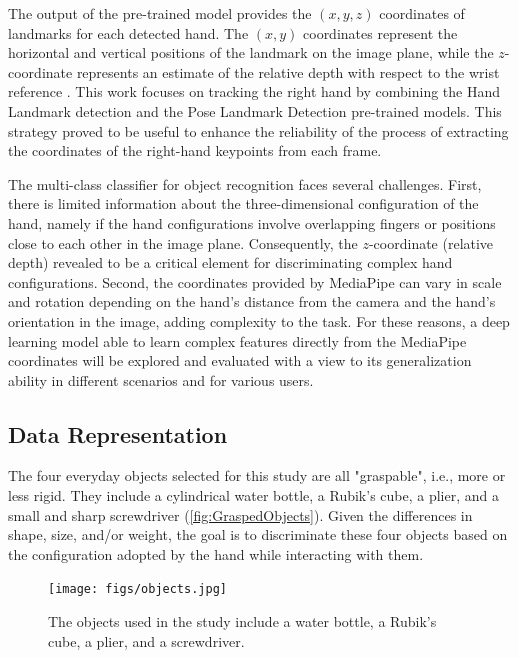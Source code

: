 The output of the pre-trained model provides the $(x,y,z)$ coordinates of landmarks for each detected hand. The $(x,y)$ coordinates represent the horizontal and vertical positions of the landmark on the image plane, while the $z$-coordinate represents an estimate of the relative depth with respect to the wrist reference \cite{Amprimo2023}. This work focuses on tracking the right hand by combining the Hand Landmark detection and the Pose Landmark Detection pre-trained models. This strategy proved to be useful to enhance the reliability of the process of extracting the coordinates of the right-hand keypoints from each frame.

The multi-class classifier for object recognition faces several challenges. First, there is limited information about the three-dimensional configuration of the hand, namely if the hand configurations involve overlapping fingers or positions close to each other in the image plane. Consequently, the $z$-coordinate (relative depth) revealed to be a critical element for discriminating complex hand configurations. Second, the coordinates provided by MediaPipe can vary in scale and rotation depending on the hand's distance from the camera and the hand's orientation in the image, adding complexity to the task. For these reasons, a deep learning model able to learn complex features directly from the MediaPipe coordinates will be explored and evaluated with a view to its generalization ability in different scenarios and for various users.

\subsection{Data Representation}
\label{section:data_representation}

The four everyday objects selected for this study are all "graspable", i.e., more or less rigid. They include a cylindrical water bottle, a Rubik's cube, a plier, and a small and sharp screwdriver (\autoref{fig:GraspedObjects}). Given the differences in shape, size, and/or weight, the goal is to discriminate these four objects based on the configuration adopted by the hand while interacting with them.

\begin{figure}[ht]
\captionsetup{width=0.7\textwidth}
\centering
\texttt{[image: figs/objects.jpg]}
\caption{The objects used in the study include a water bottle, a Rubik's cube, a plier, and a screwdriver.}
\label{fig:GraspedObjects}
\end{figure}

